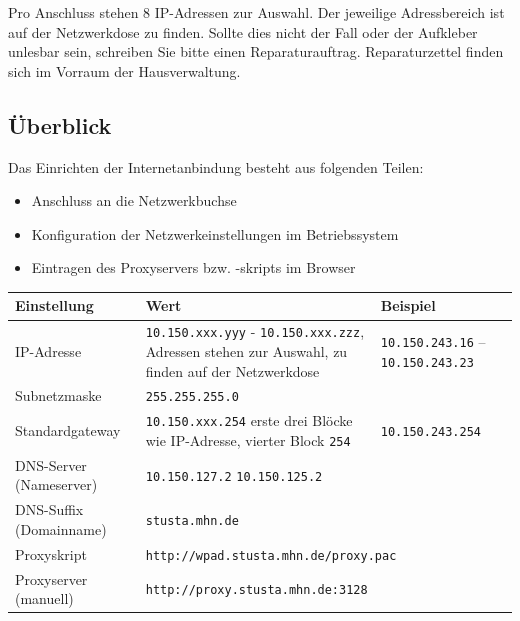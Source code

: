 \documentclass[a4paper,12pt,draft]{scrartcl}
\begin{document}
Pro Anschluss stehen 8 IP-Adressen zur Auswahl. Der jeweilige Adressbereich ist auf der Netzwerkdose zu finden. Sollte dies nicht der Fall oder der Aufkleber unlesbar sein, schreiben Sie bitte einen Reparaturauftrag. Reparaturzettel finden sich im Vorraum der Hausverwaltung.

\subsection*{Überblick}

Das Einrichten der Internetanbindung besteht aus folgenden Teilen:
\begin{itemize}
    \item Anschluss an die Netzwerkbuchse
    \item Konfiguration der Netzwerkeinstellungen im Betriebssystem
    \item Eintragen des Proxyservers bzw. -skripts im Browser
\end{itemize}


\begin{center}
  \begin{tabularx}{\linewidth}{|lXp{.2\linewidth}|}
    \hline
    Einstellung & Wert & Beispiel \\
    \hline \hline
    IP-Adresse & \nolinkurl{10.150.xxx.yyy} - \nolinkurl{10.150.xxx.zzz}, \newline 8 Adressen stehen zur Auswahl, zu finden auf der Netzwerkdose & \nolinkurl{10.150.243.16} – \nolinkurl{10.150.243.23} \\
    \hline
    Subnetzmaske & \nolinkurl{255.255.255.0} & \\
    \hline
    Standardgateway & \nolinkurl{10.150.xxx.254} \newline erste drei Blöcke wie IP-Adresse, vierter Block \nolinkurl{254} & \nolinkurl{10.150.243.254} \\
    \hline
    DNS-Server (Nameserver) & \nolinkurl{10.150.127.2} \newline \nolinkurl{10.150.125.2} & \\
    \hline
    DNS-Suffix (Domainname) & \nolinkurl{stusta.mhn.de} & \\
    \hline
    Proxyskript & \multicolumn{2}{l|}{\nolinkurl{http://wpad.stusta.mhn.de/proxy.pac}} \\
    \hline
    Proxyserver (manuell) & \multicolumn{2}{l|}{\nolinkurl{http://proxy.stusta.mhn.de:3128}} \\
    \hline
  \end{tabularx}
\end{center}
\end{document}
